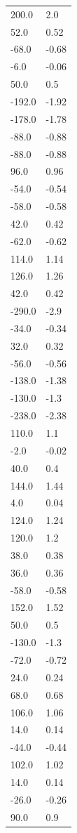 \begin{longtable}{ll}
200.0 & 2.0 \\
52.0 & 0.52 \\
-68.0 & -0.68 \\
-6.0 & -0.06 \\
50.0 & 0.5 \\
-192.0 & -1.92 \\
-178.0 & -1.78 \\
-88.0 & -0.88 \\
-88.0 & -0.88 \\
96.0 & 0.96 \\
-54.0 & -0.54 \\
-58.0 & -0.58 \\
42.0 & 0.42 \\
-62.0 & -0.62 \\
114.0 & 1.14 \\
126.0 & 1.26 \\
42.0 & 0.42 \\
-290.0 & -2.9 \\
-34.0 & -0.34 \\
32.0 & 0.32 \\
-56.0 & -0.56 \\
-138.0 & -1.38 \\
-130.0 & -1.3 \\
-238.0 & -2.38 \\
110.0 & 1.1 \\
-2.0 & -0.02 \\
40.0 & 0.4 \\
144.0 & 1.44 \\
4.0 & 0.04 \\
124.0 & 1.24 \\
120.0 & 1.2 \\
38.0 & 0.38 \\
36.0 & 0.36 \\
-58.0 & -0.58 \\
152.0 & 1.52 \\
50.0 & 0.5 \\
-130.0 & -1.3 \\
-72.0 & -0.72 \\
24.0 & 0.24 \\
68.0 & 0.68 \\
106.0 & 1.06 \\
14.0 & 0.14 \\
-44.0 & -0.44 \\
102.0 & 1.02 \\
14.0 & 0.14 \\
-26.0 & -0.26 \\
90.0 & 0.9 \\

\end{longtable}
